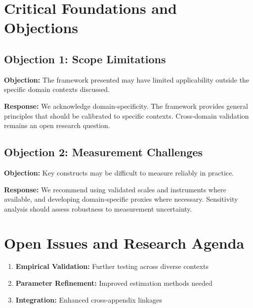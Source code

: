 
\section{Critical Foundations and Objections}
\label{sec:vvv6-foundations}

\subsection{Objection 1: Scope Limitations}

\textbf{Objection:} The framework presented may have limited applicability
outside the specific domain contexts discussed.

\textbf{Response:} We acknowledge domain-specificity. The framework provides
general principles that should be calibrated to specific contexts. Cross-domain
validation remains an open research question.

\subsection{Objection 2: Measurement Challenges}

\textbf{Objection:} Key constructs may be difficult to measure reliably in
practice.

\textbf{Response:} We recommend using validated scales and instruments where
available, and developing domain-specific proxies where necessary. Sensitivity
analysis should assess robustness to measurement uncertainty.



\section{Open Issues and Research Agenda}
\label{sec:x-open}

\begin{enumerate}
    \item \textbf{Empirical Validation:} Further testing across diverse contexts
    \item \textbf{Parameter Refinement:} Improved estimation methods needed
    \item \textbf{Integration:} Enhanced cross-appendix linkages
\end{enumerate}


